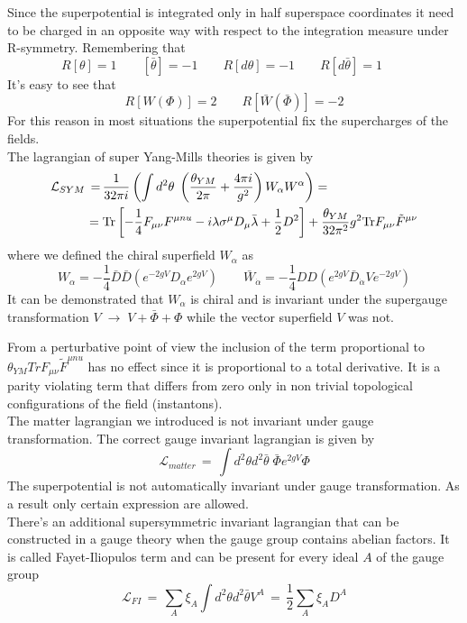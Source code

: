 \begin{appendices}
Since the superpotential is integrated only in half superspace coordinates it need to be charged in an opposite way with respect to the integration measure under R-symmetry.
Remembering  that
\begin{equation}
R[\theta] = 1 \qquad [\bar{\theta}] = - 1 \qquad R[d\theta] = -1 \qquad R [d \bar{\theta}] = 1 \qquad
\end{equation}
It's easy to see that 
\begin{equation}
R[W(\Phi)] = 2 \qquad R[\bar{W}(\bar{\Phi})] = -2
\end{equation}
For this reason in most situations the superpotential fix the supercharges of the fields.
\\
The lagrangian of super Yang-Mills theories is given by
\begin{align}
\mathcal{L}_{SYM} \, = \, & \frac{1}{32 \pi i  } \left( \int d^2 \theta \; \left( \frac{\theta_{YM}}{2 \pi}   + \frac{4 \pi i}{g^2} \right) W_{\alpha} W^{\alpha} \right) 
= 
\\
= \; & \hbox{Tr} \left[ -\frac{1}{4} F_{ \mu \nu} F^{\mu nu } - i \lambda \sigma^{\mu} D_{\mu} \bar{\lambda}  + \frac{1}{2} D^2 \right] + \frac{\theta_{YM}}{32 \pi^2 }g^2 \hbox{Tr} F_{ \mu \nu} \tilde{F}^{\mu \nu } 
\end{align}
where we defined the chiral superfield $W_{\alpha}$ as
\begin{equation}
 W_{\alpha} = - \frac{1}{4} \bar{D} \bar{D}\left(e^{-2 g V}  D_{\alpha}  e^{2g V} \right) \qquad  
\bar{W}_{\dot{\alpha}} = - \frac{1}{4} D D \left(   e^{2gV} \bar{D}_{\dot{\alpha}} V e^{-2gV} \right)  
\end{equation}
It can be demonstrated that $W_{\alpha}$ is chiral and is invariant under the supergauge transformation $V \; \rightarrow \; V + \bar{\Phi} + \Phi$ while the vector superfield $V$ was not.

From a perturbative point of view the inclusion of the term proportional to $\theta_{YM} {Tr} F_{ \mu \nu} \tilde{F}^{\mu nu }  $ has no effect since it is proportional to a total derivative. 
It is a parity violating term that differs from zero only in non trivial topological configurations of the field (instantons).
\\
The matter lagrangian we introduced is not invariant under gauge transformation.
The correct gauge invariant lagrangian is given by
\begin{equation}
 \mathcal{L}_{matter} \, = \, \int d^2 \theta d^2 \bar{\theta} \; \bar{\Phi} e^{ 2 g V} \Phi 
\end{equation}
The superpotential is not automatically invariant under gauge transformation. As a result only certain expression are allowed.
\\
There's an additional supersymmetric invariant lagrangian that can be constructed in a gauge theory when the gauge group contains abelian factors. 
It is called Fayet-Iliopulos term and can be present for every ideal $A$ of the gauge group
\begin{equation}
 \mathcal{L}_{FI} \, = \, \sum_{A} \xi_A \int d^2 \theta d^2 \bar{\theta} V^{A} \, = \, \frac{1}{2} \sum_{A} \xi_A D^A
 \end{equation}



\end{appendices}
